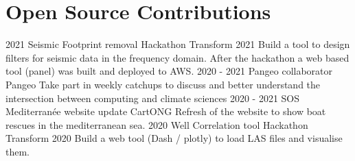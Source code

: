 \documentclass[]{friggeri-cv}
\begin{document}
\section{Open Source Contributions}
\begin{entrylist}
	\entry
	{2021}
	{Seismic Footprint removal Hackathon}
	{Transform 2021}
	{Build a tool to design filters for seismic data in the frequency domain. After the hackathon a web based tool (panel) was built and deployed to AWS.}
	\entry
	{2020 - 2021}
	{Pangeo collaborator}
	{Pangeo}
	{Take part in weekly catchups to discuss and better understand the intersection between computing and climate sciences}
	\entry
	{2020 - 2021}
	{SOS Mediterranée website update}
	{CartONG}
	{Refresh of the website to show boat rescues in the mediterranean sea.}
	\entry
	{2020}
	{Well Correlation tool Hackathon}
	{Transform 2020}
	{Build a web tool (Dash / plotly) to load LAS files and visualise them.}
\end{entrylist}
\end{document}
